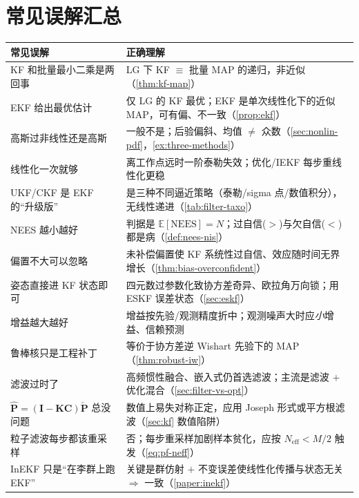 \section*{常见误解汇总}
\begin{table}[H]\centering\small
\begin{tabular}{p{} p{}}
\toprule
\textbf{常见误解} & \textbf{正确理解} \\
\midrule
KF 和批量最小二乘是两回事 & LG 下 KF $\equiv$ 批量 MAP 的递归，非近似（\cref{thm:kf-map}）\\
EKF 给出最优估计 & 仅 LG 的 KF 最优；EKF 是单次线性化下的近似 MAP，可有偏、不一致（\cref{prop:ekf}）\\
高斯过非线性还是高斯 & 一般不是；后验偏斜、均值 $\ne$ 众数（\cref{sec:nonlin-pdf}，\cref{ex:three-methods}）\\
线性化一次就够 & 离工作点远时一阶泰勒失效；优化/IEKF 每步重线性化更稳 \\
UKF/CKF 是 EKF 的“升级版” & 是三种不同逼近策略（泰勒/sigma 点/数值积分），无线性递进（\cref{tab:filter-taxo}）\\
NEES 越小越好 & 判据是 $\mathbb{E}[\text{NEES}]=N$；过自信($>$)与欠自信($<$)都是病（\cref{def:nees-nis}）\\
偏置不大可以忽略 & 未补偿偏置使 KF 系统性过自信、效应随时间无界增长（\cref{thm:bias-overconfident}）\\
姿态直接进 KF 状态即可 & 四元数过参数化致协方差奇异、欧拉角万向锁；用 ESKF 误差状态（\cref{sec:eskf}）\\
增益越大越好 & 增益按先验/观测精度折中；观测噪声大时应\emph{小}增益、信赖预测 \\
鲁棒核只是工程补丁 & 等价于协方差逆 Wishart 先验下的 MAP（\cref{thm:robust-iw}）\\
滤波过时了 & 高频惯性融合、嵌入式仍首选滤波；主流是滤波 $+$ 优化混合（\cref{sec:filter-vs-opt}）\\
$\hat{\mathbf{P}}=(\mathbf{I}-\mathbf{K}\mathbf{C})\check{\mathbf{P}}$ 总没问题 & 数值上易失对称正定，应用 Joseph 形式或平方根滤波（\cref{sec:kf} 数值陷阱）\\
粒子滤波每步都该重采样 & 否；每步重采样加剧样本贫化，应按 $N_{\text{eff}}<M/2$ 触发（\cref{eq:pf-neff}）\\
InEKF 只是“在李群上跑 EKF” & 关键是群仿射 $+$ 不变误差使线性化传播与状态无关 $\Rightarrow$ 一致（\cref{paper:inekf}）\\
\bottomrule
\end{tabular}
\end{table}

